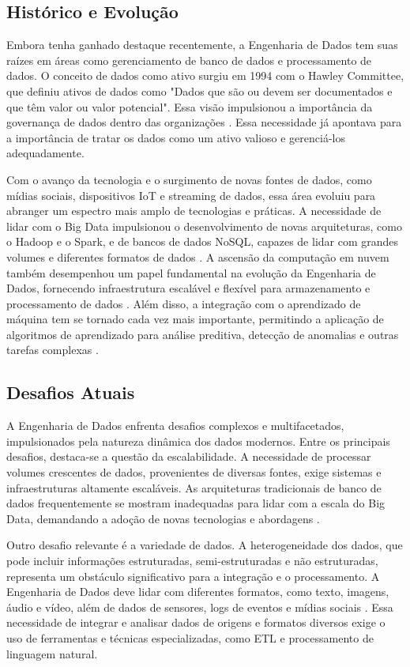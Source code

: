 \subsection{Histórico e Evolução}
Embora tenha ganhado destaque recentemente, a Engenharia de Dados tem suas raízes em áreas como
gerenciamento de banco de dados e processamento de dados. O conceito de dados como ativo surgiu em 1994 com o Hawley 
Committee, que definiu ativos de dados como "Dados que são ou devem ser documentados e que têm 
valor ou valor potencial". Essa visão impulsionou a importância da governança de dados dentro 
das organizações \cite{alhassan2016data}. Essa necessidade já apontava para a importância de tratar os dados como um ativo valioso e gerenciá-los adequadamente.

Com o avanço da tecnologia e o surgimento de novas fontes de dados, como mídias sociais, dispositivos IoT e streaming de dados, 
essa área evoluiu para abranger um espectro mais amplo de tecnologias e práticas. A necessidade de lidar com o Big Data impulsionou 
o desenvolvimento de novas arquiteturas, como o Hadoop e o Spark, e de bancos de dados NoSQL, capazes de lidar com grandes volumes 
e diferentes formatos de dados \cite{volk2019challenging}. A ascensão da computação em nuvem também desempenhou um papel fundamental na evolução da Engenharia 
de Dados, fornecendo infraestrutura escalável e flexível para armazenamento e processamento de dados \cite{katal2013big}. Além disso, a integração com 
o aprendizado de máquina tem se tornado cada vez mais importante, permitindo a aplicação de algoritmos de aprendizado para análise 
preditiva, detecção de anomalias e outras tarefas complexas \cite{lheureux2017machine}.

\subsection{Desafios Atuais}

A Engenharia de Dados enfrenta desafios complexos e multifacetados, impulsionados pela natureza dinâmica 
dos dados modernos. Entre os principais desafios, destaca-se a questão da escalabilidade. A necessidade de 
processar volumes crescentes de dados, provenientes de diversas fontes, exige sistemas e infraestruturas 
altamente escaláveis. As arquiteturas tradicionais de banco de dados frequentemente se mostram inadequadas 
para lidar com a escala do Big Data, demandando a adoção de novas tecnologias e abordagens \cite{katal2013big}.

Outro desafio relevante é a variedade de dados. A heterogeneidade dos dados, que pode incluir informações 
estruturadas, semi-estruturadas e não estruturadas, representa um obstáculo significativo para a integração 
e o processamento. A Engenharia de Dados deve lidar com diferentes formatos, como texto, imagens, áudio e 
vídeo, além de dados de sensores, logs de eventos e mídias sociais \cite{volk2019challenging}. Essa necessidade de integrar e analisar 
dados de origens e formatos diversos exige o uso de ferramentas e técnicas especializadas, como ETL e 
processamento de linguagem natural.

